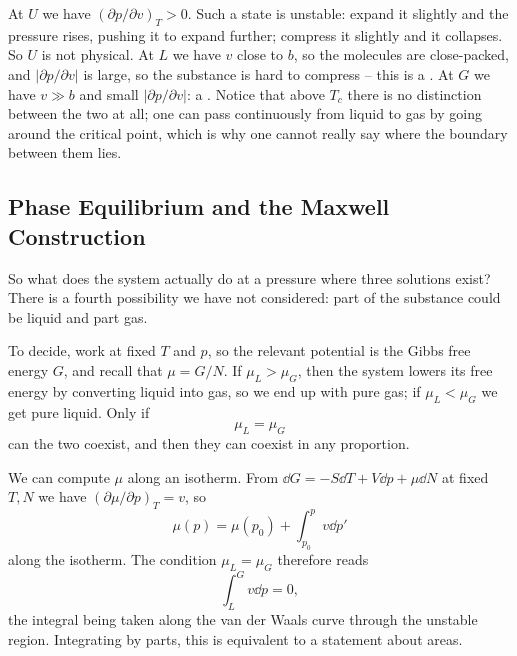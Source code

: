 \documentclass[a4paper]{scrartcl}
\begin{document}
\begin{center}
\end{center}

At $U$ we have $(\partial p/\partial v)_T > 0$. Such a state is unstable: expand it slightly and the pressure rises, pushing it to expand further; compress it slightly and it collapses. So $U$ is not physical. At $L$ we have $v$ close to $b$, so the molecules are close-packed, and $|\partial p/\partial v|$ is large, so the substance is hard to compress -- this is a . At $G$ we have $v \gg b$ and small $|\partial p/\partial v|$: a . Notice that above $T_c$ there is no distinction between the two at all; one can pass continuously from liquid to gas by going around the critical point, which is why one cannot really say where the boundary between them lies.

\subsection{Phase Equilibrium and the Maxwell Construction}

So what does the system actually do at a pressure where three solutions exist? There is a fourth possibility we have not considered: part of the substance could be liquid and part gas.

To decide, work at fixed $T$ and $p$, so the relevant potential is the Gibbs free energy $G$, and recall that $\mu = G/N$. If $\mu_L > \mu_G$, then the system lowers its free energy by converting liquid into gas, so we end up with pure gas; if $\mu_L < \mu_G$ we get pure liquid. Only if
$$
\mu_L = \mu_G
$$
can the two coexist, and then they can coexist in any proportion.

We can compute $\mu$ along an isotherm. From $\dd G = -S\dd T + V\dd p + \mu \dd N$ at fixed $T,N$ we have $(\partial \mu/\partial p)_T = v$, so
$$
\mu(p) = \mu(p_0) + \int_{p_0}^{p}v\dd p'
$$
along the isotherm. The condition $\mu_L = \mu_G$ therefore reads
$$
\int_{L}^{G} v \dd p = 0,
$$
the integral being taken along the van der Waals curve through the unstable region. Integrating by parts, this is equivalent to a statement about areas.
\end{document}
